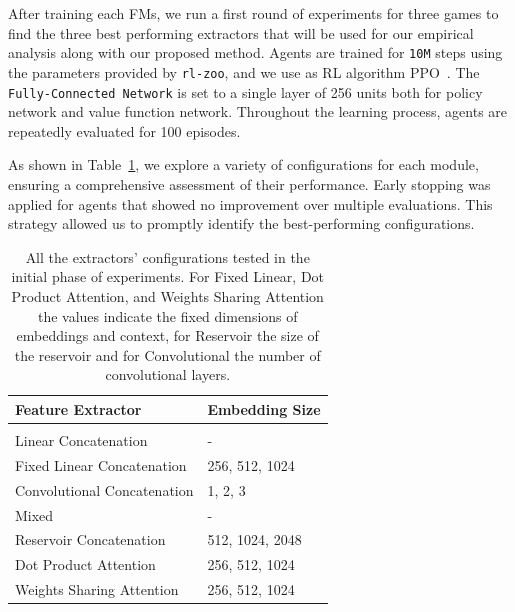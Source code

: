 After training each FMs, we run a first round of experiments for three games to find the three best performing extractors that will be used for our empirical analysis along with our proposed method.
Agents are trained for \texttt{10M} steps using the parameters provided by \texttt{rl-zoo}, and we use as RL algorithm PPO~\citep{schulman2017proximal}.
The \texttt{Fully-Connected Network} is set to a single layer of 256 units both for policy network and value function network.
Throughout the learning process, agents are repeatedly evaluated for 100 episodes.


As shown in Table~\ref{tab:emb_siz_modules}, we explore a variety of configurations for each module, ensuring a comprehensive assessment of their performance.
Early stopping was applied for agents that showed no improvement over multiple evaluations.
This strategy allowed us to promptly identify the best-performing configurations.


\begin{table}[ht]
    \begin{center}
        \begin{tabular}{ll}
            \multicolumn{1}{l}{\bf Feature Extractor}  &\multicolumn{1}{l}{\bf Embedding Size}
            \\ \hline \\
            Linear Concatenation              &  - \\
            Fixed Linear Concatenation        & 256, 512, 1024 \\
            Convolutional Concatenation       & 1, 2, 3\\
            Mixed                             & - \\
            Reservoir Concatenation           & 512, 1024, 2048 \\
            Dot Product Attention             & 256, 512, 1024 \\
            Weights Sharing Attention         & 256, 512, 1024 \\

        \end{tabular}
    \end{center}
    \caption{All the extractors' configurations tested in the initial phase of experiments. For Fixed Linear, Dot Product Attention, and Weights Sharing Attention the values indicate the fixed dimensions of embeddings and context, for Reservoir the size of the reservoir and for Convolutional the number of convolutional layers.}
    \label{tab:emb_siz_modules}
\end{table}



